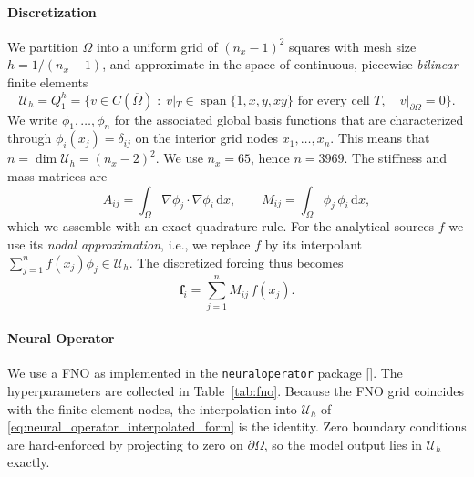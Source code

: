 \documentclass{article} %
\begin{document}
\paragraph{Discretization} We partition $\Omega$ into a uniform grid of $(n_x-1)^2$ squares with mesh size $h = 1/(n_x-1)$, and approximate in the space of continuous, piecewise \emph{bilinear} finite elements
\begin{equation*}
   \mathcal U_h = Q_1^h = \big\{ v \in C(\overline\Omega) \;:\; v|_T \in \operatorname{span}\{1, x, y, xy\} \text{ for every cell } T, \quad v|_{\partial\Omega} = 0 \big\}.
\end{equation*}
We write $\phi_1, \dots, \phi_n$ for the associated global basis functions that are characterized through $\phi_i(x_j) = \delta_{ij}$ on the interior grid nodes $x_1, \dots, x_n$. This means that $n = \dim \mathcal U_h = (n_x-2)^2$. We use $n_x = 65$, hence $n = 3969$. The stiffness and mass matrices are
\begin{equation}\label{eq:appendix_stiffness_mass}
   A_{ij} = \int_\Omega \nabla\phi_j \cdot \nabla\phi_i \,\mathrm dx,
   \qquad
   M_{ij} = \int_\Omega \phi_j\,\phi_i \,\mathrm dx,
\end{equation}
which we assemble with an exact quadrature rule. For the analytical sources $f$ we use its \emph{nodal approximation}, i.e., we replace $f$ by its interpolant $\sum_{j=1}^n f(x_j)\phi_j \in \mathcal U_h$. The discretized forcing thus becomes
\begin{equation}\label{eq:appendix_consistent_rhs}
   \mathbf f_i = \sum_{j=1}^n M_{ij}\,f(x_j).
\end{equation}

\paragraph{Neural Operator} We use a FNO as implemented in the \texttt{neuraloperator} package []. The hyperparameters are collected in Table~\ref{tab:fno}. Because the FNO grid coincides with the finite element nodes, the interpolation into $\mathcal U_h$ of \eqref{eq:neural_operator_interpolated_form} is the identity. Zero boundary conditions are hard-enforced by projecting to zero on $\partial\Omega$, so the model output lies in $\mathcal U_h$ exactly.
\end{document}
